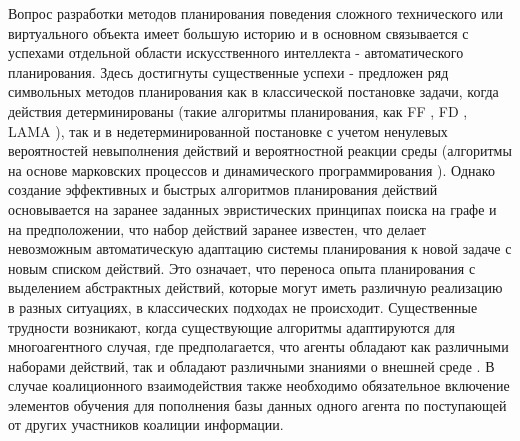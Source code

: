 \documentclass[12pt]{scrartcl}
\begin{document}
	Вопрос разработки методов планирования поведения сложного технического или виртуального объекта имеет большую историю и в основном связывается с успехами отдельной области искусственного интеллекта - автоматического планирования. Здесь достигнуты существенные успехи - предложен ряд символьных методов планирования как в классической постановке задачи, когда действия детерминированы (такие алгоритмы планирования, как FF \cite{Hoffmann2001}, FD \cite{Helmert2006}, LAMA \cite{Richter2010}), так и в недетерминированной постановке с учетом ненулевых вероятностей невыполнения действий и вероятностной реакции среды (алгоритмы на основе марковских процессов и динамического программирования \cite{Barto1995,Bonet2009}). Однако создание эффективных и быстрых алгоритмов планирования действий основывается на заранее заданных эвристических принципах поиска на графе и на предположении, что набор действий заранее известен, что делает невозможным автоматическую адаптацию системы планирования к новой задаче с новым списком действий. Это означает, что переноса опыта планирования с выделением абстрактных действий, которые могут иметь различную реализацию в разных ситуациях, в классических подходах не происходит. Существенные трудности возникают, когда существующие алгоритмы адаптируются для многоагентного случая, где предполагается, что агенты обладают как различными наборами действий, так и обладают различными знаниями о внешней среде \cite{Brafman2015}. В случае коалиционного взаимодействия также необходимо обязательное включение элементов обучения для пополнения базы данных одного агента по поступающей от других участников коалиции информации.
	
\end{document}
